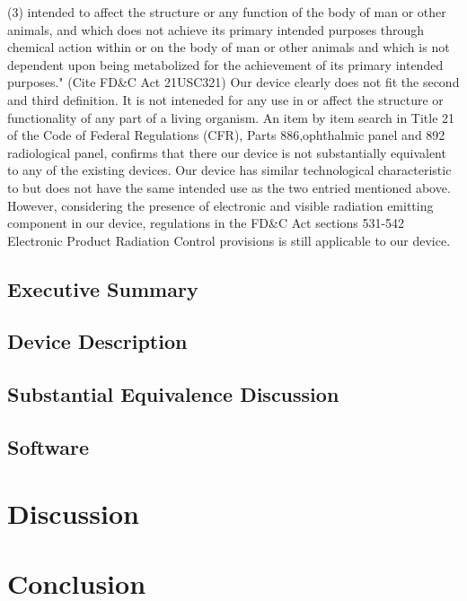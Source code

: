 \documentclass{article}
\begin{document}
(3) intended to affect the structure or any function of the body of man or other animals, and which does not achieve its primary intended purposes through chemical action within or on the body of man or other animals and which is not dependent upon being metabolized for the achievement of its primary intended purposes." (Cite FD&C Act 21USC321)
Our device clearly does not fit the second and third definition. It is not inteneded for any use in or affect the structure or functionality of any part of a living organism. An item by item search in Title 21 of the Code of Federal Regulations (CFR), Parts 886,ophthalmic panel and 892 radiological panel, confirms that there our device is not substantially equivalent to any of the existing devices. Our device has similar technological characteristic to but does not have the same intended use as the two entried mentioned above.
However, considering the presence of electronic and visible radiation emitting component in our device, regulations in the FD&C Act sections 531-542 Electronic Product Radiation Control provisions is still applicable to our device.









\setcounter{subsection}{0}
\subsection{Executive Summary}
\subsection{Device Description}
\subsection{Substantial Equivalence Discussion}





\subsection{Software}




\section{Discussion}
\label{sec:discussion}

\section{Conclusion}
\label{sec:conclusion}


\newpage
{}


\end{document}
